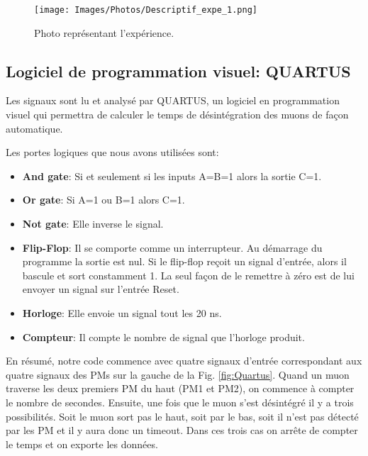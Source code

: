 \documentclass[12pt]{article}
\begin{document}
\begin{figure}[htpb!]
    \centering
    \texttt{[image: Images/Photos/Descriptif\_expe\_1.png]}
    \caption{Photo représentant l'expérience.}
    \label{fig:Experience_1_montage}
\end{figure}


\newpage
\subsection{Logiciel de programmation visuel: QUARTUS}

Les signaux sont lu et analysé par QUARTUS, un logiciel en programmation visuel qui permettra de calculer le temps de désintégration des muons de façon automatique.

Les portes logiques que nous avons utilisées sont:

\begin{itemize}
    \item \textbf{And gate}: Si et seulement si les inputs A=B=1 alors la sortie C=1.
    \item \textbf{Or gate}: Si A=1 ou B=1 alors C=1.
    \item \textbf{Not gate}: Elle inverse le signal.
    \item \textbf{Flip-Flop}: Il se comporte comme un interrupteur. Au démarrage du programme la sortie est nul. Si le flip-flop reçoit un signal d'entrée, alors il bascule et sort constamment 1. La seul façon de le remettre à zéro est de lui envoyer un signal sur l'entrée Reset.
    \item \textbf{Horloge}: Elle envoie un signal tout les 20 ns.
    \item \textbf{Compteur}: Il compte le nombre de signal que l'horloge produit.
\end{itemize}

En résumé, notre code commence avec quatre signaux d'entrée correspondant aux quatre signaux des PMs sur la gauche de la Fig. \ref{fig:Quartus}. Quand un muon traverse les deux premiers PM du haut (PM1 et PM2), on commence à compter le nombre de secondes. Ensuite, une fois que le muon s'est désintégré il y a trois possibilités. Soit le muon sort pas le haut, soit par le bas, soit il n'est pas détecté par les PM et il y aura donc un timeout. Dans ces trois cas on arrête de compter le temps et on exporte les données.
\end{document}
